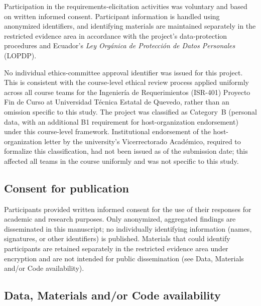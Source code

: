 \documentclass[12pt]{article}
\begin{document}
Participation in the requirements-elicitation activities was voluntary
and based on written informed consent. Participant information is
handled using anonymized identifiers, and identifying materials are
maintained separately in the restricted evidence area in accordance
with the project's data-protection procedures and Ecuador's
\textit{Ley Orgánica de Protección de Datos Personales}
(LOPDP).

\par
No individual ethics-committee approval identifier was issued for
this project. This is consistent with the course-level ethical
review process applied uniformly across all course teams for the
Ingeniería de Requerimientos (ISR-401) Proyecto Fin de Curso at
Universidad Técnica Estatal de Quevedo, rather than an omission
specific to this study. The project was classified as Category~B
(personal data, with an additional B1 requirement for host-organization
endorsement) under this course-level framework. Institutional
endorsement of the host-organization letter by the university's
Vicerrectorado Académico, required to formalize this classification,
had not been issued as of the submission date; this affected all
teams in the course uniformly and was not specific to this study.


\subsection*{Consent for publication}

Participants provided written informed consent for the use of their
responses for academic and research purposes. Only anonymized,
aggregated findings are disseminated in this manuscript; no
individually identifying information (names, signatures, or other
identifiers) is published. Materials that could identify participants
are retained separately in the restricted evidence area under
encryption and are not intended for public dissemination (see Data,
Materials and/or Code availability).


\subsection*{Data, Materials and/or Code availability}
\end{document}
